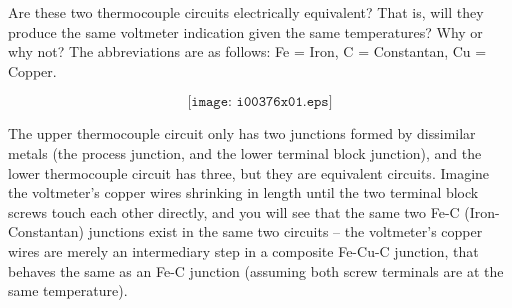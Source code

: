 

Are these two thermocouple circuits electrically equivalent?  That is, will they produce the same voltmeter indication given the same temperatures?  Why or why not?  The abbreviations are as follows: Fe = Iron, C = Constantan, Cu = Copper.

$$\texttt{[image: i00376x01.eps]}$$







The upper thermocouple circuit only has two junctions formed by dissimilar metals (the process junction, and the lower terminal block junction), and the lower thermocouple circuit has three, but they are equivalent circuits.  Imagine the voltmeter's copper wires shrinking in length until the two terminal block screws touch each other directly, and you will see that the same two Fe-C (Iron-Constantan) junctions exist in the same two circuits -- the voltmeter's copper wires are merely an intermediary step in a composite Fe-Cu-C junction, that behaves the same as an Fe-C junction (assuming both screw terminals are at the same temperature).











